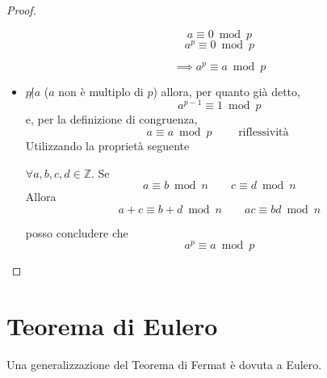 \documentclass[a4paper,12pt, oneside]{book}
\begin{document}
\begin{teorema}
\begin{proof}
\begin{itemize}
							\begin{minipage}{0.45\textwidth}
								$$a \equiv 0 \bmod p$$
								$$a^p \equiv 0 \bmod p$$
							\end{minipage}%
							\hfill
							\begin{minipage}{0.45\textwidth}
								$$\implies a^p \equiv a \bmod p$$
							\end{minipage}%
							
						\item $p \not| a$ ($a$ non è multiplo di $p$) allora, per quanto già detto,
							$$a^{p-1} \equiv 1 \bmod p$$
							e, per la definizione di congruenza, $$a \equiv a \bmod p \qquad \mbox{ riflessività }$$
							Utilizzando la proprietà seguente
							\begin{shaded}
								\begin{nota} $\forall a,b,c,d \in \mathbb{Z}$.
									Se $$a \equiv b \bmod n \qquad c \equiv d \bmod n$$
									Allora $$a+c \equiv b+d \bmod n \qquad ac \equiv bd \bmod n$$
								\end{nota}
							\end{shaded}
							posso concludere che
							$$a^p \equiv a \bmod p$$
					\end{itemize}
					
				\end{proof}
			\end{teorema}
			
	\section{Teorema di Eulero}
		Una generalizzazione del Teorema di Fermat è dovuta a Eulero.
\end{document}
